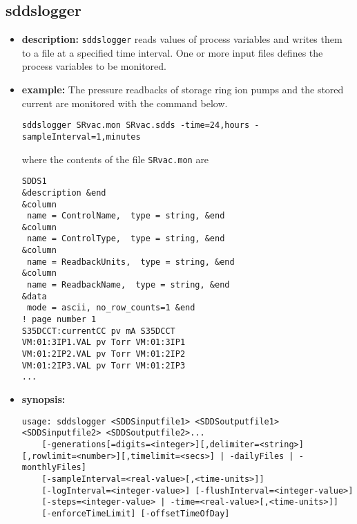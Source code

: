 %
%
\begin{latexonly}
\newpage
\end{latexonly}

%
%
\subsection{sddslogger}
\label{sddslogger}

\begin{itemize}
\item {\bf description:}
%
%
\verb+sddslogger+ reads values of process variables and writes them to a file at a specified time interval.
One or more input files defines the process variables to be monitored.
\item {\bf example:} 
%
% 
%
The pressure readbacks of storage ring ion pumps and the stored current are monitored
with the command below.
\begin{verbatim}
sddslogger SRvac.mon SRvac.sdds -time=24,hours -sampleInterval=1,minutes
\end{verbatim}
where the contents of the file \verb+SRvac.mon+ are
\begin{verbatim}
SDDS1
&description &end
&column
 name = ControlName,  type = string, &end
&column
 name = ControlType,  type = string, &end
&column
 name = ReadbackUnits,  type = string, &end
&column
 name = ReadbackName,  type = string, &end
&data
 mode = ascii, no_row_counts=1 &end
! page number 1
S35DCCT:currentCC pv mA S35DCCT
VM:01:3IP1.VAL pv Torr VM:01:3IP1
VM:01:2IP2.VAL pv Torr VM:01:2IP2 
VM:01:2IP3.VAL pv Torr VM:01:2IP3 
...
\end{verbatim}
\item {\bf synopsis:} 
%
%
\begin{verbatim}
usage: sddslogger <SDDSinputfile1> <SDDSoutputfile1> <SDDSinputfile2> <SDDSoutputfile2>...
    [-generations[=digits=<integer>][,delimiter=<string>][,rowlimit=<number>][,timelimit=<secs>] | -dailyFiles | -monthlyFiles]
    [-sampleInterval=<real-value>[,<time-units>]]
    [-logInterval=<integer-value>] [-flushInterval=<integer-value>]
    [-steps=<integer-value> | -time=<real-value>[,<time-units>]]
    [-enforceTimeLimit] [-offsetTimeOfDay]

\end{verbatim}
\end{itemize}
